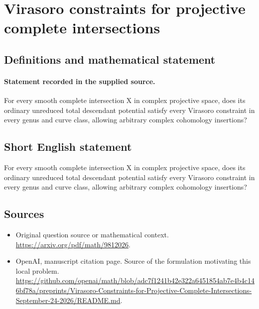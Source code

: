 \documentclass[11pt]{article}
\begin{document}
\section*{Virasoro constraints for projective complete intersections}\label{30007053}
\subsection{Definitions and mathematical statement}
\paragraph{Statement recorded in the supplied source.}
For every smooth complete intersection X in complex projective space, does its ordinary unreduced total descendant potential satisfy every Virasoro constraint in every genus and curve class, allowing arbitrary complex cohomology insertions?
\subsection{Short English statement}
For every smooth complete intersection X in complex projective space, does its ordinary unreduced total descendant potential satisfy every Virasoro constraint in every genus and curve class, allowing arbitrary complex cohomology insertions?
\subsection{Sources}
\begin{itemize}
\item[S1] Original question source or mathematical context.
\url{https://arxiv.org/pdf/math/9812026}.
\item[S2] OpenAI, manuscript citation page. Source of the formulation motivating this local problem.
\url{https://github.com/openai/math/blob/adc7f1241b42e322a6451854ab7e4b4c146bf78a/preprints/Virasoro-Constraints-for-Projective-Complete-Intersections-September-24-2026/README.md}.
\end{itemize}
\end{document}
